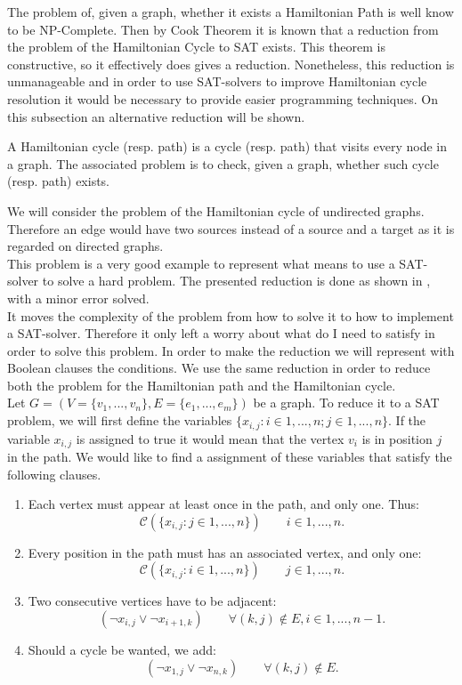 The problem of, given a graph, whether it exists a Hamiltonian Path is well know to be NP-Complete. Then by Cook Theorem it is known that a reduction from the problem of the Hamiltonian Cycle to SAT exists. This theorem is constructive, so it effectively does gives a reduction. Nonetheless, this reduction is unmanageable and in order to use SAT-solvers to improve Hamiltonian cycle resolution it would be necessary to provide easier programming techniques. On this subsection an alternative reduction will be shown.

\begin{definition}
  A Hamiltonian cycle (resp. path) is a cycle (resp. path) that visits every node in a graph. The associated problem is to check, given a graph, whether such cycle (resp. path) exists.
\end{definition}

We will consider the problem of the Hamiltonian cycle of undirected graphs. Therefore an edge would have two sources instead of a source and a target as it is regarded on directed graphs.\\

This problem is a very good example to represent what means to use a SAT-solver to solve a hard problem. The presented reduction is done as shown in \cite{49593}, with a minor error solved.\\


It moves the complexity of the problem from how to solve it to how to implement a SAT-solver. Therefore it only left a worry about what do I need to satisfy in order to solve this problem. In order to make the reduction we will represent with Boolean clauses the conditions. We use the same reduction in order to reduce both the problem for the Hamiltonian path and the Hamiltonian cycle.\\

Let $G=(V=\{ v_1,...,v_n\},E= \{e_1,...,e_m\})$ be a graph. To reduce it to a SAT problem, we will first define the variables $\{x_{i,j}: i\in 1,...,n ; j\in 1,...,n \}$. If the variable $x_{i,j}$ is assigned to true it would mean that the vertex $v_i$ is in position $j$ in the path. We would like to find a assignment of these variables that satisfy the following clauses.


\begin{enumerate}
\item Each vertex must appear at least once in the path, and only one. Thus:
  $$\mathcal{C}( \{x_{i,j} : j \in 1,...,n \}) \qquad i \in 1,...,n.$$

\item Every position in the path must has an associated vertex, and only one:
  $$\mathcal{C}( \{x_{i,j} : i \in 1,...,n \}) \qquad j \in 1,...,n.$$
\item Two consecutive vertices have to be adjacent:
  $$(\neg x_{i,j} \vee \neg x_{i+1,k})\qquad \forall (k,j) \not \in E, i \in 1,...,n-1.$$
\item Should a cycle be wanted, we add:
  $$(\neg x_{1,j} \vee \neg x_{n,k})\qquad \forall (k,j) \not \in E.$$
\end{enumerate}

